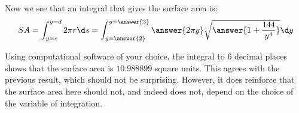 \documentclass{ximera}
\begin{document}
\begin{exercise}
\begin{exercise}
\end{exercise}

\begin{exercise}
Now we see that an integral that gives the surface area is: 
\[
SA= \int_{y=c}^{y=d} 2 \pi r \d s = \int_{y=\answer{2}}^{y=\answer{3}} \answer{2 \pi y} \sqrt{\answer{1+\frac{144}{y^4}}} \d y
\]

Using computational software of your choice, the integral to 6 decimal places shows that the surface area is $10.988899$ square units.  This agrees with the previous result, which should not be surprising.  However, it does reinforce that the surface area here should not, and indeed does not, depend on the choice of the variable of integration.

\end{exercise}



\end{exercise}
\end{document}
